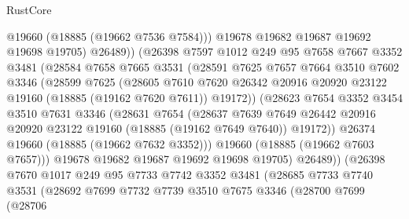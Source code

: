 \begin{lexlean}{RustCore}
\begin{coremodule}
                      @19660
                      (@18885 (@19662 @7536 @7584)))
                    @19678
                    @19682
                    @19687
                    @19692
                    @19698
                    @19705)
                  @26489))
              (@26398
                @7597
                @1012
                @249
                @95
                @7658
                @7667
                @3352
                @3481
                (@28584
                  @7658
                  @7665
                  @3531
                  (@28591
                    @7625
                    @7657
                    @7664
                    @3510
                    @7602
                    @3346
                    (@28599
                      @7625
                      (@28605
                        @7610
                        @7620
                        @26342
                        @20916
                        @20920
                        @23122
                        @19160
                        (@18885 (@19162 @7620 @7611))
                        @19172))
                    (@28623
                      @7654
                      @3352
                      @3454
                      @3510
                      @7631
                      @3346
                      (@28631
                        @7654
                        (@28637
                          @7639
                          @7649
                          @26442
                          @20916
                          @20920
                          @23122
                          @19160
                          (@18885 (@19162 @7649 @7640))
                          @19172))
                      @26374
                      @19660
                      (@18885 (@19662 @7632 @3352)))
                    @19660
                    (@18885 (@19662 @7603 @7657)))
                  @19678
                  @19682
                  @19687
                  @19692
                  @19698
                  @19705)
                @26489))
            (@26398
              @7670
              @1017
              @249
              @95
              @7733
              @7742
              @3352
              @3481
              (@28685
                @7733
                @7740
                @3531
                (@28692
                  @7699
                  @7732
                  @7739
                  @3510
                  @7675
                  @3346
                  (@28700
                    @7699
                    (@28706

\end{coremodule}
\end{lexlean}

